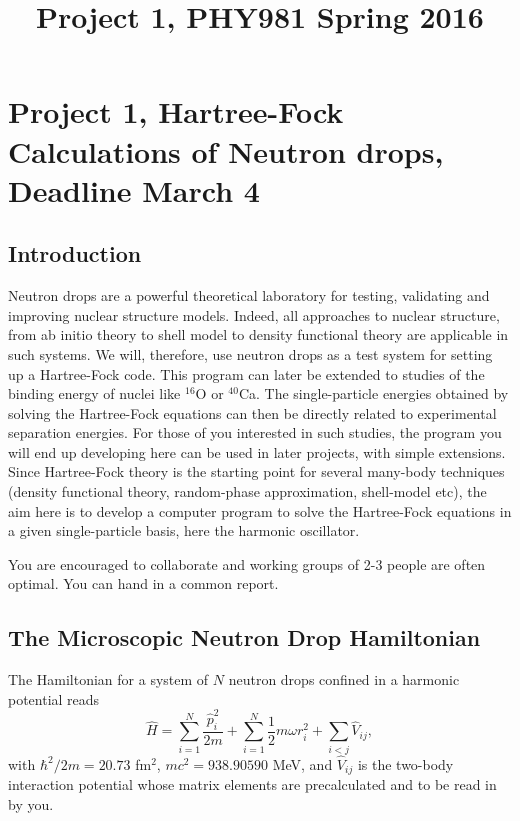 \documentclass[11pt,a4wide]{article}
\begin{document}
\title{Project 1,  PHY981 Spring 2016}
\maketitle
\section*{Project 1, Hartree-Fock Calculations of Neutron drops, Deadline March 4}


\subsection*{Introduction}

Neutron drops are a powerful theoretical laboratory for testing,
validating and improving nuclear structure models. Indeed, all
approaches to nuclear structure, from ab initio theory to shell model
to density functional theory are applicable in such systems. We will,
therefore, use neutron drops as a test system for setting up a
Hartree-Fock code.  This program can later be extended to studies of
the binding energy of nuclei like $^{16}$O or $^{40}$Ca. The
single-particle energies obtained by solving the Hartree-Fock
equations can then be directly related to experimental separation
energies. For those of you interested in such studies, the program you
will end up developing here can be used in later projects, with simple
extensions.  Since Hartree-Fock theory is the starting point for
several many-body techniques (density functional theory, random-phase
approximation, shell-model etc), the aim here is to develop a computer
program to solve the Hartree-Fock equations in a given single-particle basis,
here the harmonic oscillator.

You are encouraged to collaborate and working groups of 2-3 people are
often optimal. You can hand in a common report.


\subsection*{The Microscopic Neutron Drop Hamiltonian}

The Hamiltonian for a system of $N$ neutron drops confined in a
harmonic potential reads
\begin{equation}
\hat{H} 
= 
\sum_{i=1}^{N} \frac{\hat{p}_{i}^{2}}{2m}
+
\sum_{i=1}^{N} \frac{1}{2} m\omega {r}_{i}^{2}
+
\sum_{i<j} \hat{V}_{ij},
\end{equation}
with $\hbar^{2}/2m = 20.73$ fm$^{2}$, $mc^{2} = 938.90590$ MeV, and 
$\hat{V}_{ij}$ is the two-body interaction potential whose 
matrix elements are precalculated
and to be read in by you.
\end{document}
